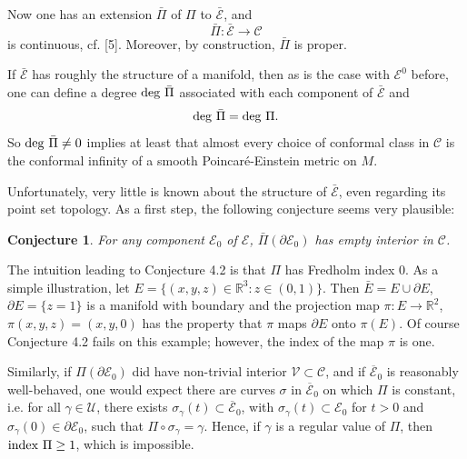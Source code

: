 \documentclass[11pt,amsfonts]{amsart}
\newtheorem{conjecture}[theorem]{Conjecture}
\begin{document}
 Now one has an extension $\bar{\Pi}$ of $\Pi$ to $\bar{\mathcal E}$, 
and 
\begin{equation} \label{e4.3}
\bar{\Pi}: \bar{\mathcal E} \rightarrow  {\mathcal C}  
\end{equation}
is continuous, cf. [5]. Moreover, by construction, $\bar{\Pi}$ is 
proper. 

 If $\bar{\mathcal E}$ has roughly the structure of a manifold, then 
as is the case with ${\mathcal E}^{0}$ before, one can define a degree 
${\rm deg} \ \bar{\Pi}$ associated with each component of $\bar{\mathcal E}$
and 
$${\rm deg} \ \bar{\Pi} = {\rm deg} \ \Pi. $$
So ${\rm deg} \  \bar{\Pi} \neq 0$ implies at least that almost every choice 
of conformal class in ${\mathcal C}$ is the conformal infinity of a smooth 
Poincar\'e-Einstein metric on $M$.  

 Unfortunately, very little is known about the structure of 
$\bar{\mathcal E}$, even regarding its point set topology. As a first 
step, the following conjecture seems very plausible:
\begin{conjecture} \label{c4.2}
{\rm  For any component ${\mathcal E}_{0}$ of ${\mathcal E}$, 
$\bar \Pi(\partial {\mathcal E}_{0})$ has empty interior in 
${\mathcal C}$.  }
\end{conjecture}

  The intuition leading to Conjecture 4.2 is that $\Pi$ has Fredholm index 
0. As a simple illustration, let $E = \{(x,y,z)\in {\mathbb R}^{3}: z \in 
(0,1)\}$. Then $\bar E = E \cup \partial E$, $\partial E = \{z = 1\}$ is 
a manifold with boundary and the projection map $\pi: E \rightarrow 
{\mathbb R}^{2}$, $\pi(x,y,z) = (x,y,0)$ has the property that $\pi$ 
maps $\partial E$ onto $\pi(E)$. Of course Conjecture 4.2 fails on this 
example; however, the index of the map $\pi$ is one. 

  Similarly, if $\Pi(\partial {\mathcal E}_{0})$ did have non-trivial interior 
${\mathcal V} \subset {\mathcal C}$, and if $\overline{\mathcal E}_{0}$ is 
reasonably well-behaved, one would expect there are curves $\sigma$ in 
$\overline{\mathcal E}_{0}$ on which $\Pi$ is constant, i.e. for all 
$\gamma \in {\mathcal U}$, there exists $\sigma_{\gamma}(t) \subset 
\overline{\mathcal E}_{0}$, with $\sigma_{\gamma}(t) \subset 
{\mathcal E}_{0}$ for $t > 0$ and $\sigma_{\gamma}(0) \in 
\partial{\mathcal E}_{0}$, such that $\Pi \circ \sigma_{\gamma} = \gamma$. 
Hence, if $\gamma$ is a regular value of $\Pi$, then ${\rm index} \ \Pi \geq 1$, 
which is impossible. 
\end{document}
